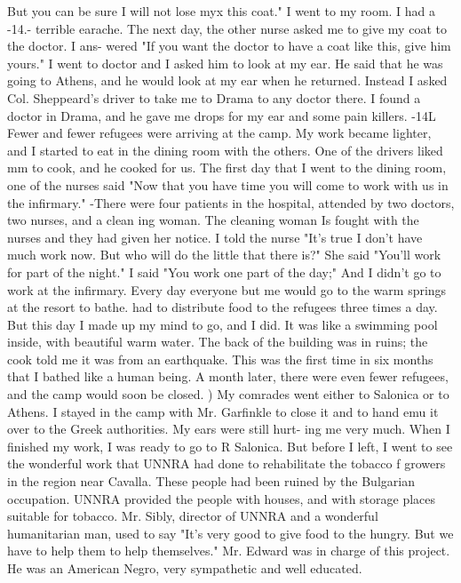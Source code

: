 But you can be sure I will not lose myx this coat."
I went to my room.
I had a 
-14.- 
terrible earache.
The next day, the other nurse asked me to give my coat to the doctor.
I ans-
wered "If you want the doctor to have a coat like this, give him yours."
I went to 
doctor and I asked him to look at my ear.
He said that he was going to Athens, and 
he would look at my ear when he returned.
Instead I asked Col.
Sheppeard's driver 
to take me to Drama to any doctor there.
I found a doctor in Drama, and he gave me 
drops for my ear and some pain killers.
-14L 
Fewer and fewer refugees were arriving at the camp.
My work became lighter, and 
I started to eat in the dining room with the others.
One of the drivers liked mm to 
cook, and he cooked for us.
The first day that I went to the dining room, one of the 
nurses said "Now that you have time you will come to work with us in the infirmary."
-There were four patients in the hospital, attended by two doctors, two nurses, and a clean 
ing woman.
The cleaning woman Is fought with the nurses and they had given her notice.
I told the nurse "It's true I don't have much work now.
But who will do the little 
that there is?"
She said "You'll work for part of the night."
I said "You work one 
part of the day;" And I didn't go to work at the infirmary.
Every day everyone but me would go to the warm springs at the resort to bathe.
had to distribute food to the refugees three times a day.
But this day I made up my 
mind to go, and I did.
It was like a swimming pool inside, with beautiful warm water.
The 
back of the building was in ruins; the cook told me it was from an earthquake.
This was 
the first time in six months that I bathed like a human being.
A month later, there were even fewer refugees, and the camp would soon be closed. 
)
My comrades went either to Salonica or to Athens.
I stayed in the camp with Mr.
Garfinkle 
to close it and to hand emu it over to the Greek authorities.
My ears were still hurt-
ing me very much.
When I finished my work, I was ready to go to R Salonica.
But before I left, I went 
to see the wonderful work that UNNRA had done to rehabilitate the tobacco f growers in the 
region near Cavalla.
These people had been ruined by the Bulgarian occupation.
UNNRA 
provided the people with houses, and with storage places suitable for tobacco.
Mr.
Sibly, 
director of UNNRA and a wonderful humanitarian man, used to say "It's very good to give 
food to the hungry.
But we have to help them to help themselves."
Mr.
Edward was in 
charge of this project.
He was an American Negro, very sympathetic and well educated.
